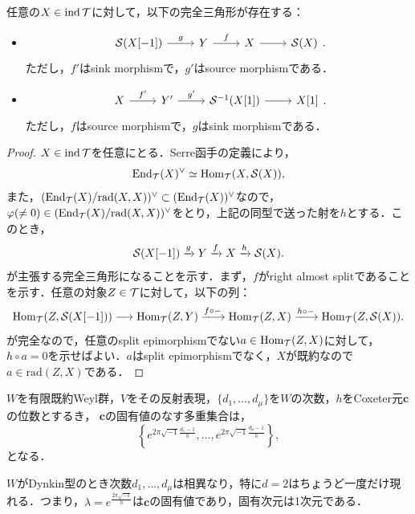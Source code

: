 \begin{thm}\cite{Hap88}
	任意の$X\in\operatorname{ind}{\mathcal T}$に対して，以下の完全三角形が存在する：\vspace{-3mm}
	\begin{itemize}
		\item 
		\[
		\begin{tikzcd}
			\Serre(X[-1])\ar[r,"g"]& Y\ar[r,"f"]& X\ar[r] & \Serre(X)
		\end{tikzcd}.
	\]
ただし，$f'$はsink morphismで，$g'$はsource morphismである．
\item
		\[
		\begin{tikzcd}
			X\ar[r,"f'"]& Y'\ar[r,"g'"]& \Serre^{-1}(X[1])\ar[r] & X[1]
		\end{tikzcd}.
	\]
ただし，$f$はsource morphismで，$g$はsink morphismである．
	\end{itemize}
\end{thm}
\begin{proof}
	$X\in\operatorname{ind}{\mathcal T}$を任意にとる．Serre函手の定義により，
		\[\operatorname{\mathrm{End}}_{{\mathcal T}}(X)^\vee\simeq \operatorname{\mathrm{Hom}}_{{\mathcal T}}(X,{\mathcal{S}}(X)),\]
		また，$(\operatorname{\mathrm{End}}_{{\mathcal T}}(X)/\mathrm{rad}(X,X))^\vee \subset (\operatorname{\mathrm{End}}_{{\mathcal T}}(X))^\vee$なので，
		$\varphi(\neq 0)\in (\operatorname{\mathrm{End}}_{{\mathcal T}}(X)/\mathrm{rad}(X,X))^\vee $をとり，上記の同型で送った射を$h$とする．このとき，
		\[{\mathcal{S}}(X[-1])\xrightarrow{g}Y\xrightarrow{f} X\xrightarrow{h} {\mathcal{S}}(X).\]
		が主張する完全三角形になることを示す．まず，$f$がright almost splitであることを示す．任意の対象$Z\in{\mathcal T}$に対して，以下の列：
		\[\Hom_{\T}(Z,\Serre(X[-1]))\longrightarrow \Hom_{\T}(Z,Y)\xlongrightarrow{f\circ -} \Hom_{\T}(Z,X)\xlongrightarrow{h\circ -} \Hom_{\T}(Z,\Serre(X)).\]
		が完全なので，任意のsplit epimorphismでない$a\in\operatorname{\mathrm{Hom}}_{{\mathcal T}}(Z,X)$に対して，$h\circ a = 0$を示せばよい．$a$はsplit epimorphismでなく，$X$が既約なので$a\in\mathrm{rad}(Z,X)$である．
\end{proof}
\begin{defn}
	
\end{defn}
\begin{prop}\cite{Hum90}
	$W$を有限既約Weyl群，$V$をその反射表現，$\{d_1,\ldots,d_\mu\}$を$W$の次数，$h$をCoxeter元$\mathbf{c}$の位数とするき，
	$\mathbf{c}$の固有値のなす多重集合は，
	\[\left\{e^{2\pi\sqrt{-1}\frac{d_1 -1}{h}},\ldots,e^{2\pi\sqrt{-1}\frac{d_{\mu} -1}{h}}\right\},\]
	となる．
\end{prop}

\begin{cor}
	$W$がDynkin型のとき次数$d_1,\ldots, d_{\mu}$は相異なり，特に$d=2$はちょうど一度だけ現れる．つまり，$\lambda = e^{\frac{2\pi\sqrt{-1}}{h}}$は$\mathbf{c}$の固有値であり，固有次元は1次元である．
\end{cor}

